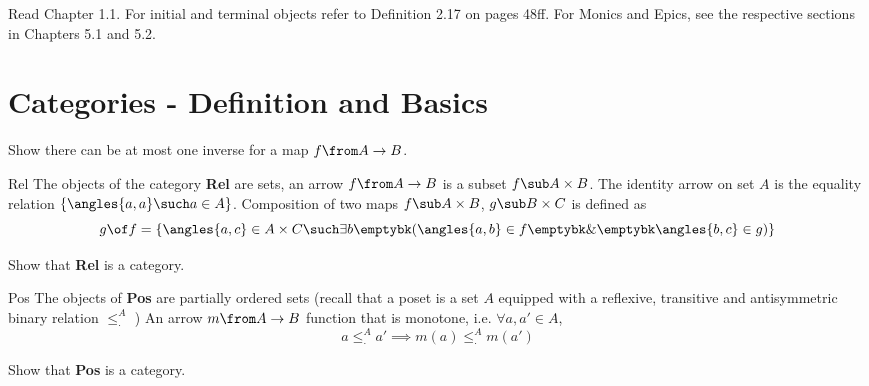 \def\pathToRoot{../../}




\begin{hint}
  Read Chapter 1.1. For initial and terminal objects refer to Definition 2.17 on pages 48ff. For Monics and Epics, see the respective sections in Chapters 5.1 and 5.2.
\end{hint}

%

\section{Categories - Definition and Basics}

\begin {exercise}
Show there can be at most one inverse for a map $f \from A \to B$.
\end{exercise}

\begin {definition}{Rel}
The objects of the category \textbf{Rel} are sets, an arrow $f \from A \to B$ is a subset $f \sub A \times B$. 
The identity arrow on set $A$ is the equality relation $\{\angles{a,a} \such a \in A\}$. 
Composition of two maps $f \sub A \times B$, $g \sub B \times C$ is defined as 
\[ g \of f = \{ \angles{a, c} \in A \times C \such \exists b \emptybk (\angles {a, b} \in f \emptybk \& \emptybk \angles{b, c} \in g)\} \]
\end{definition}

\begin {exercise}
Show that \textbf{Rel} is a category.
\end{exercise}


\begin{definition}{Pos} The objects of  \textbf{Pos} are partially ordered sets 
(recall that a poset is a set $A$ equipped with a reflexive, transitive and antisymmetric binary relation $\leq^A_\cdot $ ) 
An arrow $ m \from A \to B $ function that is monotone, i.e. $\forall a, a' \in A$, 
\[a \leq^A_\cdot a' \implies m(a) \leq^A_\cdot m(a')\]
\end{definition}

\begin {exercise}
Show that \textbf{Pos} is a category.
\end{exercise}



